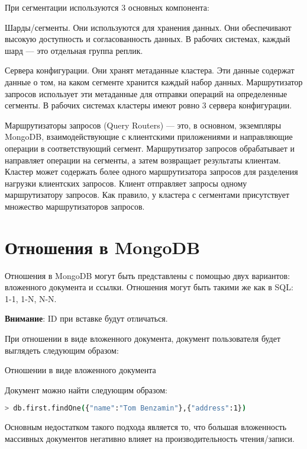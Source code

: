 При сегментации используются 3 основных компонента:\par
Шарды/сегменты. Они используются для хранения данных. Они
обеспечивают высокую доступность и согласованность данных. В рабочих
системах, каждый шард --- это отдельная группа реплик.\par
Сервера конфигурации. Они хранят метаданные кластера. Эти данные
содержат данные о том, на каком сегменте хранится каждый набор данных.
Маршрутизатор запросов использует эти метаданные для отправки операций на
определенные сегменты. В рабочих системах кластеры имеют ровно 3 сервера
конфигурации.\par
Маршрутизаторы запросов (Query Routers) --- это, в основном,
экземпляры MongoDB, взаимодействующие с клиентскими приложениями и
направляющие операции в соответствующий сегмент. Маршрутизатор запросов
обрабатывает и направляет операции на сегменты, а затем возвращает
результаты клиентам. Кластер может содержать более одного маршрутизатора
запросов для разделения нагрузки клиентских запросов. Клиент отправляет
запросы одному маршрутизатору запросов. Как правило, у кластера с
сегментами присутствует множество маршрутизаторов запросов.

\section{Отношения в MongoDB}

Отношения в MongoDB могут быть представлены с помощью двух
вариантов: вложенного документа и ссылки. Отношения могут быть такими же
как в SQL: 1-1, 1-N, N-N.\par
\textbf{Внимание}: ID при вставке будут отличаться.\par
При отношении в виде вложенного документа, документ пользователя
будет выглядеть следующим образом:

\begin{image}
	\caption{Отношении в виде вложенного документа}
	\label{fig:relationship}
\end{image}

Документ можно найти следующим образом:

\begin{lstlisting}[language=bash]
> db.first.findOne({"name":"Tom Benzamin"},{"address":1})
\end{lstlisting}

Основным недостатком такого подхода является то, что большая
вложенность массивных документов негативно влияет на производительность
чтения/записи.

